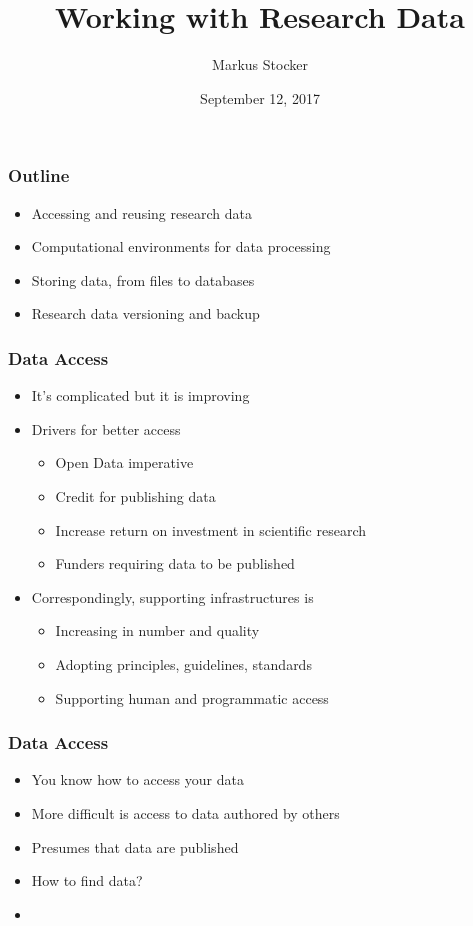 \documentclass{beamer}
\title{Working with Research Data}
\author{Markus Stocker}
\date{September 12, 2017}
\begin{document}
\maketitle

\begin{frame}
  \frametitle{Outline}
  
  \begin{itemize}
  \item Accessing and reusing research data
  \item Computational environments for data processing
  \item Storing data, from files to databases
  \item Research data versioning and backup
  \end{itemize}
\end{frame}

\begin{frame}
  \frametitle{Data Access}
  
  \begin{itemize}
  \item It's complicated but it is improving
  \item Drivers for better access
  \begin{itemize}
  \item Open Data imperative
  \item Credit for publishing data
  \item Increase return on investment in scientific research
  \item Funders requiring data to be published
  \end{itemize}
  \item Correspondingly, supporting infrastructures is
  \begin{itemize}
  \item Increasing in number and quality
  \item Adopting principles, guidelines, standards
  \item Supporting human and programmatic access
  \end{itemize}
  \end{itemize}
\end{frame}

\begin{frame}
  \frametitle{Data Access}
  
  \begin{itemize}
  \item You know how to access your data
  \item More difficult is access to data authored by others
  \item Presumes that data are published 
  \item How to find data?
  \item 
  \end{itemize}
\end{frame}
\end{document}
